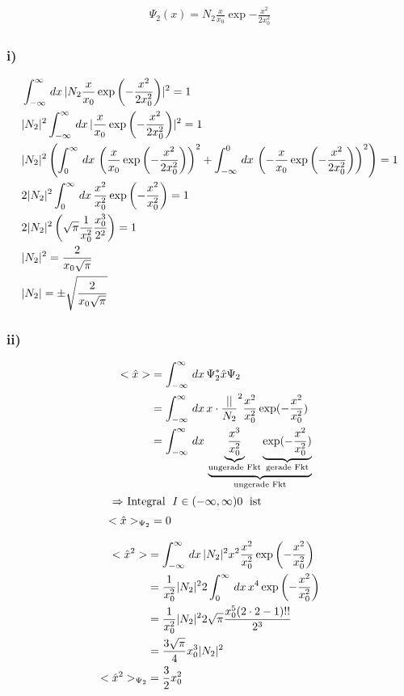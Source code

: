\begin{align}
    \Psi_2 (x)=N_2 \frac{x}{x_0} \exp{-\frac{x^2}{2x_0^2}}
\end{align}

\subsubsection{i)}

\begin{align}
    &\int_{-\infty}^{\infty}\,dx\, \lvert N_2\frac{x}{x_0}\exp\left(-\frac{x^2}{2x_0^2}\right)\rvert^2=1\\
    &\lvert N_2\rvert^2 \int_{-\infty}^{\infty}\,dx\, \lvert\frac{x}{x_0}\exp\left(-\frac{x^2}{2x_0^2}\right)\rvert^2=1\\
    &\lvert N_2\rvert^2 \left(\int_0^{\infty}\,dx\,\left(\frac{x}{x_0}\exp\left(-\frac{x^2}{2x_0^2}\right)\right)^2+ \int_{-\infty}^0\,dx\,\left(-\frac{x}{x_0} \exp\left(-\frac{x^2}{2x_0^2}\right)\right)^2 \right)=1\\
    &2 \lvert N_2\rvert^2 \int_0^{\infty}\,dx\, \frac{x^2}{x_0^2} \exp\left(-\frac{x^2}{x_0^2}\right)=1\\
    &2 \lvert N_2\rvert^2 \left(\sqrt{\pi} \frac{1}{x_0^2} \frac{x_0^3}{2^2}\right)=1\\
    &\lvert N_2\rvert^2=\frac{2}{x_0\sqrt{\pi}}\\
    &\lvert N_2\rvert= \pm \sqrt{\frac{2}{x_0\sqrt{\pi}}}
\end{align}

\subsubsection{ii)}

\begin{align}
    <\hat x > &= \int_{-\infty}^{\infty}\,dx\, \Psi _2^* \hat x \Psi _2\\
    &= \int_{-\infty}^{\infty}\,dx\, x\cdot \frac \abs{N_2}^2 \frac{x^2}{x_0^2}\exp(-\frac{x^2}{x_0^2})\\
    &=\int_{-\infty}^{\infty}\,dx\, \underbrace{\underbrace{\frac{x^3}{x_0^2}}_{\text{ungerade Fkt}} \underbrace{\exp(-\frac{x^2}{x_0^2})}_{\text{gerade Fkt}}}_{\text{ungerade Fkt}}\\
    \intertext{
        $\Rightarrow $ Integral $\;I \in (-\infty,\infty) 0\; $ ist
    }
    <\hat x >_{\Psi_2}&=0
\end{align}

\begin{align}
    <\hat x ^2> &= \int_{-\infty}^{\infty}\,dx\, \lvert N_2\rvert^2 x^2 \frac{x^2}{x_0^2} \exp\left(-\frac{x^2}{x_0^2}\right)\\
    &=\frac{1}{x_0^2} \lvert N_2\rvert^2 2 \int_0^{\infty}\,dx\, x^4 \exp\left(-\frac{x^2}{x_0^2}\right)\\
    &=\frac{1}{x_0^2} \lvert N_2\rvert^2 2\sqrt{\pi} \frac{x_0^5(2\cdot2-1)!!}{2^3}\\
    &=\frac{3\sqrt{\pi}}{4}x_0^3 \lvert N_2\rvert^2\\
    <\hat x ^2>_{\Psi _2}&= \frac{3}{2} x_0^2
\end{align}


